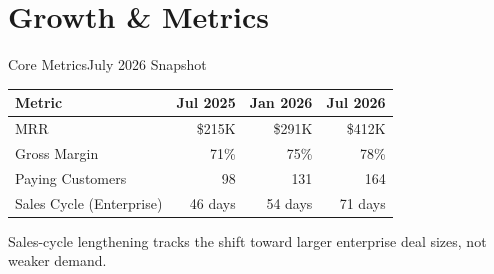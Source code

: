 \section{Growth \& Metrics}

\begin{frame}{Core Metrics}{July 2026 Snapshot}

  \centering
  \begin{minipage}{0.235\textwidth}
    \begin{statcard}
    \end{statcard}
  \end{minipage}\hfill
  \begin{minipage}{0.235\textwidth}
    \begin{statcard}
    \end{statcard}
  \end{minipage}\hfill
  \begin{minipage}{0.235\textwidth}
    \begin{statcard}
    \end{statcard}
  \end{minipage}\hfill
  \begin{minipage}{0.235\textwidth}
    \begin{statcard}
    \end{statcard}
  \end{minipage}
  \par

  \vspace{0.2cm}
  {\small{}
  \renewcommand{\arraystretch}{1.15}
  \begin{tabular}{l r r r}
    \toprule
    \rowcolor{panelBg}
    \textcolor{textLight}{\textbf{Metric}} & \textcolor{textLight}{\textbf{Jul 2025}} & \textcolor{textLight}{\textbf{Jan 2026}} & \textcolor{accent}{\textbf{Jul 2026}} \\
    \midrule
    MRR                       & \$215K  & \$291K  & \$412K \\
    \rowcolor{panelBg}
    Gross Margin              & 71\%    & 75\%    & 78\% \\
    Paying Customers          & 98      & 131     & 164 \\
    \rowcolor{panelBg}
    Sales Cycle (Enterprise)  & 46 days & 54 days & 71 days \\
    \bottomrule
  \end{tabular}}

  \vspace{0.12cm}
  {\scriptsize\textcolor{textMuted}{Sales-cycle lengthening tracks the shift toward larger enterprise deal sizes, not weaker demand.}}

\end{frame}

